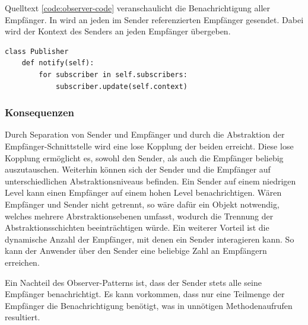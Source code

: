 Quelltext \ref{code:observer-code} veranschaulicht die Benachrichtigung aller Empfänger. In  wird an jeden im Sender referenzierten Empfänger  gesendet. Dabei wird der Kontext des Senders an jeden Empfänger übergeben.

\lstset{language=python}
\begin{lstlisting}[caption={Quelltext der Methode \code{notify} des Publishers, welche über alle Empfänger iteriert und diese benachrichtigt.}, label=code:observer-code]
class Publisher
	def notify(self):
        for subscriber in self.subscribers:
            subscriber.update(self.context)
\end{lstlisting}


\subsubsection*{Konsequenzen}

Durch Separation von Sender und Empfänger und durch die Abstraktion der Empfänger-Schnittstelle wird eine lose Kopplung der beiden erreicht. Diese lose Kopplung ermöglicht es, sowohl den Sender, als auch die Empfänger beliebig auszutauschen. Weiterhin können sich der Sender und die Empfänger auf unterschiedlichen Abstraktionsniveaus befinden. Ein Sender auf einem niedrigen Level kann einen Empfänger auf einem hohen Level benachrichtigen. Wären Empfänger und Sender nicht getrennt, so wäre dafür ein Objekt notwendig, welches mehrere Abrstraktionsebenen umfasst, wodurch die Trennung der Abstraktionsschichten beeinträchtigen würde. Ein weiterer Vorteil ist die dynamische Anzahl der Empfänger, mit denen ein Sender interagieren kann. So kann der Anwender über den Sender eine beliebige Zahl an Empfängern erreichen.

Ein Nachteil des Observer-Patterns ist, dass der Sender stets alle seine Empfänger benachrichtigt. Es kann vorkommen, dass nur eine Teilmenge der Empfänger die Benachrichtigung benötigt, was in unnötigen Methodenaufrufen resultiert. \cite{gamma_design_1995}
